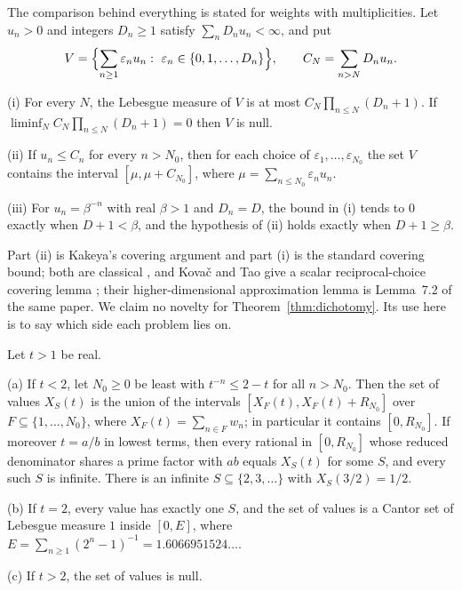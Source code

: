 \documentclass[11pt]{article}
\begin{document}
The comparison behind everything is stated for weights with multiplicities.
Let $u_n>0$ and integers $D_n\ge1$ satisfy $\sum_nD_nu_n<\infty$, and put
\[
 V=\Bigl\{\sum_{n\ge1}\varepsilon_nu_n:\ \varepsilon_n\in\{0,1,\dots,D_n\}\Bigr\},
 \qquad C_N=\sum_{n>N}D_nu_n .
\]

\begin{theorem}\label{thm:dichotomy}
\textup{(i)} For every $N$, the Lebesgue measure of $V$ is at most
$C_N\prod_{n\le N}(D_n+1)$.  If $\liminf_NC_N\prod_{n\le N}(D_n+1)=0$ then $V$
is null.

\textup{(ii)} If $u_n\le C_n$ for every $n>N_0$, then for each choice of
$\varepsilon_1,\dots,\varepsilon_{N_0}$ the set $V$ contains the interval
$[\mu,\mu+C_{N_0}]$, where $\mu=\sum_{n\le N_0}\varepsilon_nu_n$.

\textup{(iii)} For $u_n=\beta^{-n}$ with real $\beta>1$ and $D_n=D$, the bound in
\textup{(i)} tends to $0$ exactly when $D+1<\beta$, and the hypothesis of
\textup{(ii)} holds exactly when $D+1\ge\beta$.
\end{theorem}

Part (ii) is Kakeya's covering argument and part (i) is the standard covering
bound; both are classical \cite{hornich1941,nitecki2013,fridy1966}, and
Kova\v{c} and Tao give a scalar reciprocal-choice covering lemma
\cite[Lemma~5.1]{kovactao2024}; their higher-dimensional approximation lemma is
Lemma~7.2 of the same paper.  We claim no novelty for
Theorem~\ref{thm:dichotomy}.  Its use here is to say which side each problem
lies on.

\begin{theorem}\label{thm:bases}
Let $t>1$ be real.

\textup{(a)} If $t<2$, let $N_0\ge0$ be least with $t^{-n}\le2-t$ for all
$n>N_0$.  Then the set of values $X_S(t)$ is the union of the intervals
$[X_F(t),X_F(t)+R_{N_0}]$ over $F\subseteq\{1,\dots,N_0\}$, where
$X_F(t)=\sum_{n\in F}w_n$; in particular it contains $[0,R_{N_0}]$.  If moreover
$t=a/b$ in lowest terms, then every rational in $[0,R_{N_0}]$ whose reduced
denominator shares a prime factor with $ab$ equals $X_S(t)$ for some $S$, and
every such $S$ is infinite.  There is an infinite $S\subseteq\{2,3,\dots\}$
with $X_S(3/2)=1/2$.

\textup{(b)} If $t=2$, every value has exactly one $S$, and the set of values
is a Cantor set of Lebesgue measure $1$ inside $[0,E]$, where
$E=\sum_{n\ge1}(2^n-1)^{-1}=1.6066951524\ldots$.

\textup{(c)} If $t>2$, the set of values is null.
\end{theorem}
\end{document}
